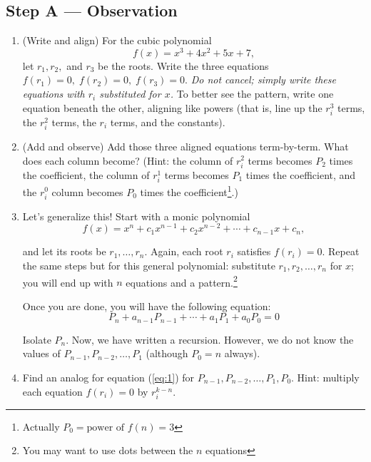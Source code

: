 \documentclass{tufte-handout}
\begin{document}
\subsection*{Step A — Observation}
\begin{enumerate}[label=\textbf{A\arabic*.}, leftmargin=*, itemsep=3em]
  \item (Write and align) For the cubic polynomial
  \[
    f(x)=x^3+4x^2+5x+7,
  \]
  let $r_1, r_2,$ and $r_3$ be the roots. Write the three equations $f(r_1)=0,\; f(r_2)=0,\; f(r_3)=0$. \textit{Do not cancel; simply write these equations with $r_i$ substituted for $x$.} To better see the pattern, write one equation beneath the other, aligning like powers (that is, line up the $r_i^3$ terms, the $r_i^2$ terms, the $r_i$ terms, and the constants). 
  \item (Add and observe) Add those three aligned equations term-by-term. What does each column become? (Hint: the column of $r_i^2$ terms becomes $P_2$ times the coefficient, the column of $r_i^1$ terms becomes $P_1$ times the coefficient, and the $r_i^0$ column becomes $P_0$ times the coefficient\footnote{Actually $P_0=\text{power of } f(n)=3$}.)
  \item Let's generalize this! Start with a monic polynomial
\[
f(x)=x^n + c_1 x^{n-1} + c_2 x^{n-2} + \cdots + c_{n-1} x + c_n,
\]

and let its roots be $r_1,\dots,r_n$. Again, each root $r_i$ satisfies $f(r_i)=0$. Repeat the same steps but for this general polynomial: substitute $r_1,r_2,\dots,r_n$ for $x$; you will end up with $n$ equations and a pattern.\footnote{You may want to use dots between the $n$ equations}

\vspace{18em}
Once you are done, you will have the following equation:
\begin{equation}\label{eq:1}
P_n+a_{n-1}P_{n-1}+\cdots+a_1P_1+a_0P_0=0
\end{equation}

Isolate $P_n$. Now, we have written a recursion. However, we do not know the values of $P_{n-1}, P_{n-2},\dots,P_1$ (although $P_0=n$ always). 

\item Find an analog for equation (\ref{eq:1}) for $P_{n-1}, P_{n-2},\dots,P_1,P_0$. Hint: multiply each equation $f(r_i)=0$ by $r_i^{k-n}$.
\vspace{18em}

\end{enumerate}
\end{document}

